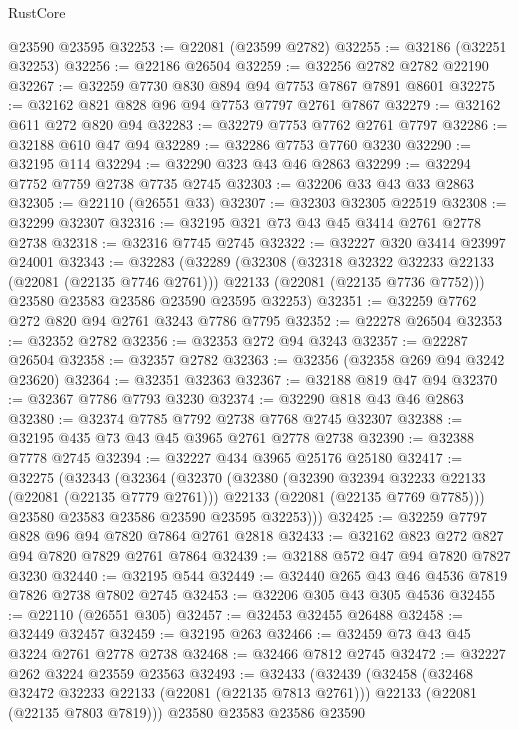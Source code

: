 \begin{lexlean}{RustCore}
\begin{coremodule}
    @23590
    @23595
@32253 := @22081 (@23599 @2782)
@32255 := @32186 (@32251 @32253)
@32256 := @22186 @26504
@32259 := @32256 @2782 @2782 @22190
@32267 := @32259 @7730 @830 @894 @94 @7753 @7867 @7891 @8601
@32275 := @32162 @821 @828 @96 @94 @7753 @7797 @2761 @7867
@32279 := @32162 @611 @272 @820 @94
@32283 := @32279 @7753 @7762 @2761 @7797
@32286 := @32188 @610 @47 @94
@32289 := @32286 @7753 @7760 @3230
@32290 := @32195 @114
@32294 := @32290 @323 @43 @46 @2863
@32299 := @32294 @7752 @7759 @2738 @7735 @2745
@32303 := @32206 @33 @43 @33 @2863
@32305 := @22110 (@26551 @33)
@32307 := @32303 @32305 @22519
@32308 := @32299 @32307
@32316 := @32195 @321 @73 @43 @45 @3414 @2761 @2778 @2738
@32318 := @32316 @7745 @2745
@32322 := @32227 @320 @3414 @23997 @24001
@32343 := @32283
    (@32289
      (@32308
        (@32318 @32322 @32233 @22133 (@22081 (@22135 @7746 @2761)))
        @22133
        (@22081 (@22135 @7736 @7752)))
      @23580
      @23583
      @23586
      @23590
      @23595
      @32253)
@32351 := @32259 @7762 @272 @820 @94 @2761 @3243 @7786 @7795
@32352 := @22278 @26504
@32353 := @32352 @2782
@32356 := @32353 @272 @94 @3243
@32357 := @22287 @26504
@32358 := @32357 @2782
@32363 := @32356 (@32358 @269 @94 @3242 @23620)
@32364 := @32351 @32363
@32367 := @32188 @819 @47 @94
@32370 := @32367 @7786 @7793 @3230
@32374 := @32290 @818 @43 @46 @2863
@32380 := @32374 @7785 @7792 @2738 @7768 @2745 @32307
@32388 := @32195 @435 @73 @43 @45 @3965 @2761 @2778 @2738
@32390 := @32388 @7778 @2745
@32394 := @32227 @434 @3965 @25176 @25180
@32417 := @32275
    (@32343
      (@32364
        (@32370
          (@32380
            (@32390 @32394 @32233 @22133 (@22081 (@22135 @7779 @2761)))
            @22133
            (@22081 (@22135 @7769 @7785)))
          @23580
          @23583
          @23586
          @23590
          @23595
          @32253)))
@32425 := @32259 @7797 @828 @96 @94 @7820 @7864 @2761 @2818
@32433 := @32162 @823 @272 @827 @94 @7820 @7829 @2761 @7864
@32439 := @32188 @572 @47 @94 @7820 @7827 @3230
@32440 := @32195 @544
@32449 := @32440 @265 @43 @46 @4536 @7819 @7826 @2738 @7802 @2745
@32453 := @32206 @305 @43 @305 @4536
@32455 := @22110 (@26551 @305)
@32457 := @32453 @32455 @26488
@32458 := @32449 @32457
@32459 := @32195 @263
@32466 := @32459 @73 @43 @45 @3224 @2761 @2778 @2738
@32468 := @32466 @7812 @2745
@32472 := @32227 @262 @3224 @23559 @23563
@32493 := @32433
    (@32439
      (@32458
        (@32468 @32472 @32233 @22133 (@22081 (@22135 @7813 @2761)))
        @22133
        (@22081 (@22135 @7803 @7819)))
      @23580
      @23583
      @23586
      @23590

\end{coremodule}
\end{lexlean}
